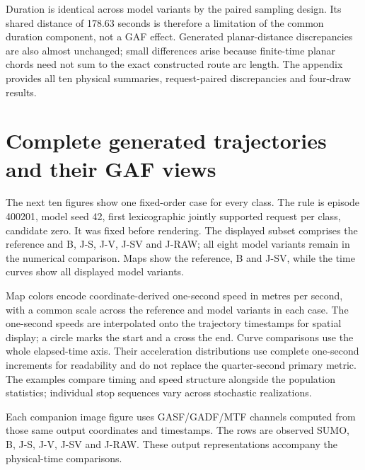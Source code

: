 
Duration is identical across model variants by the paired sampling design. Its shared distance of 178.63 seconds is therefore a limitation of the common duration component, not a GAF effect. Generated planar-distance discrepancies are also almost unchanged; small differences arise because finite-time planar chords need not sum to the exact constructed route arc length. The appendix provides all ten physical summaries, request-paired discrepancies and four-draw results.
\FloatBarrier
\section{Complete generated trajectories and their GAF views}
The next ten figures show one fixed-order case for every class. The rule is episode 400201, model seed 42, first lexicographic jointly supported request per class, candidate zero. It was fixed before rendering. The displayed subset comprises the reference and B, J-S, J-V, J-SV and J-RAW; all eight model variants remain in the numerical comparison. Maps show the reference, B and J-SV, while the time curves show all displayed model variants.

Map colors encode coordinate-derived one-second speed in metres per second, with a common scale across the reference and model variants in each case. The one-second speeds are interpolated onto the trajectory timestamps for spatial display; a circle marks the start and a cross the end. Curve comparisons use the whole elapsed-time axis. Their acceleration distributions use complete one-second increments for readability and do not replace the quarter-second primary metric. The examples compare timing and speed structure alongside the population statistics; individual stop sequences vary across stochastic realizations.

Each companion image figure uses GASF/GADF/MTF channels computed from those same output coordinates and timestamps.  The rows are observed SUMO, B, J-S, J-V, J-SV and J-RAW. These output representations accompany the physical-time comparisons.

